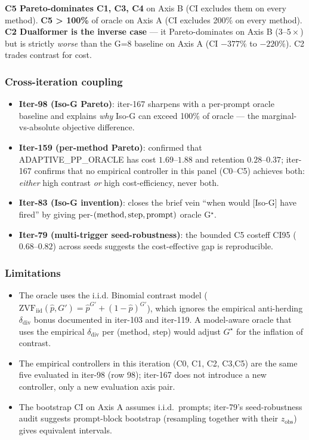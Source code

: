 \textbf{C5 Pareto-dominates C1, C3, C4} on Axis B (CI excludes them on every
method). \textbf{C5 > 100\%} of oracle on Axis A (CI excludes 200\% on every
method). \textbf{C2 Dualformer is the inverse case} --- it Pareto-dominates
on Axis B ($3$--$5\times$) but is strictly \emph{worse} than the G=8 baseline
on Axis A (CI $-377\%$ to $-220\%$). C2 trades contrast for cost.

\subsubsection*{Cross-iteration coupling}

\begin{itemize}
\item \textbf{Iter-98 (Iso-G Pareto)}: iter-167 sharpens with a per-prompt
      oracle baseline and explains \emph{why} Iso-G can exceed 100\% of
      oracle --- the marginal-vs-absolute objective difference.
\item \textbf{Iter-159 (per-method Pareto)}: confirmed that ADAPTIVE\_PP\_ORACLE
      has cost $1.69$--$1.88$ and retention $0.28$--$0.37$; iter-167 confirms
      that no empirical controller in this panel (C0--C5) achieves both:
      \emph{either} high contrast \emph{or} high cost-efficiency, never both.
\item \textbf{Iter-83 (Iso-G invention)}: closes the brief vein
      ``when would [Iso-G] have fired'' by giving per-$({\rm method},
      {\rm step}, {\rm prompt})$ oracle G$^\star$.
\item \textbf{Iter-79 (multi-trigger seed-robustness)}: the bounded C5
      costeff CI95 ($0.68$--$0.82$) across seeds suggests the
      cost-effective gap is reproducible.
\end{itemize}

\subsubsection*{Limitations}

\begin{itemize}
\item The oracle uses the i.i.d. Binomial contrast model
      ($\mathrm{ZVF}_{\mathrm{iid}}(\hat p, G') = \hat p^{G'} + (1-\hat p)^{G'}$),
      which ignores the empirical anti-herding $\delta_{\mathrm{div}}$
      bonus documented in iter-103 and iter-119. A model-aware oracle that
      uses the empirical $\delta_{\mathrm{div}}$ per (method, step) would
      adjust $G^\star$ for the inflation of contrast.
\item The empirical controllers in this iteration (C0, C1, C2, C3,C5) are the
      same five evaluated in iter-98 (row 98); iter-167 does not
      introduce a new controller, only a new evaluation axis pair.
\item The bootstrap CI on Axis A assumes i.i.d.\ prompts; iter-79's
      seed-robustness audit suggests prompt-block bootstrap (resampling
      together with their $z_{\mathrm{obs}}$) gives equivalent intervals.
\end{itemize}

